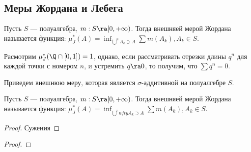 
\subsection{Меры Жордана и Лебега}
\begin{definition}
    Пусть \(S\) --- полуалгебра, \(m: S \ra [0, +\infty)\). Тогда внешняей мерой Жордана называется функция: \(\mu_J^*(A) = \inf_{\bigcup^n A_k \supset A} \sum m(A_k), A_k \in S\).
\end{definition}

\begin{example}
    Расмотрим \(\mu_J^*(\Q\cap [0, 1]) = 1\), однако, если рассматривать отрезки длины \(q^n\) для каждой точки с номером \(n\), и устремить \(q \ra 0\), то получим, что \(\sum q^n = 0\).
\end{example}

Приведем внешнюю меру, которая является \(\sigma\)-аддитивной на полуалгебре \(S\).

\begin{definition}
    Пусть \(S\) --- полуалгебра, \(m: S \ra [0, +\infty)\). Тогда внешняей мерой Жордана называется функция: \(\mu_J^*(A) = \inf_{\bigcup^infty A_k \supset A} \sum m(A_k), A_k \in S\).
\end{definition}

\begin{proof}
    Сужения 
\end{proof}
\begin{proof}
    
\end{proof}
